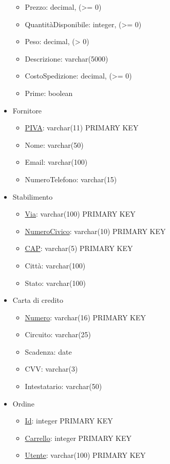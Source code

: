 \documentclass[11pt]{article}
\begin{document}
\begin{itemize}
\begin{itemize}
        \item Prezzo: decimal, (\textgreater{}= 0)
        \item QuantitàDisponibile: integer, (\textgreater{}= 0)
        \item Peso: decimal, (\textgreater{} 0)
        \item Descrizione: varchar(5000)
        \item CostoSpedizione: decimal, (\textgreater{}= 0)
        \item Prime: boolean
    \end{itemize}
    \item Fornitore
    \begin{itemize}
        \item \underline{PIVA}: varchar(11) PRIMARY KEY
        \item Nome: varchar(50)
        \item Email: varchar(100)
        \item NumeroTelefono: varchar(15)
    \end{itemize}
    \item Stabilimento
    \begin{itemize}
        \item \underline{Via}: varchar(100) PRIMARY KEY
        \item \underline{NumeroCivico}: varchar(10) PRIMARY KEY
        \item \underline{CAP}: varchar(5) PRIMARY KEY
        \item Città: varchar(100)
        \item Stato: varchar(100)
    \end{itemize}
    \item Carta di credito
    \begin{itemize}
        \item \underline{Numero}: varchar(16) PRIMARY KEY
        \item Circuito: varchar(25)
        \item Scadenza: date
        \item CVV: varchar(3)
        \item Intestatario: varchar(50)
    \end{itemize}
    \item Ordine
    \begin{itemize}
        \item \underline{Id}: integer PRIMARY KEY
        \item \underline{Carrello}: integer PRIMARY KEY
        \item \underline{Utente}: varchar(100) PRIMARY KEY

\end{itemize}
\end{itemize}
\end{document}
